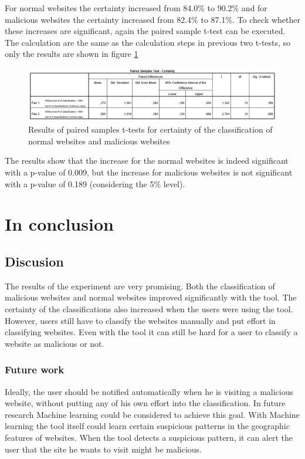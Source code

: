 \documentclass[twoside,openright,notitlepage]{uva-bachelor-thesis}
\begin{document}
For normal websites the certainty increased from 84.0\% to 90.2\% and for malicious websites the certainty increased from 82.4\% to 87.1\%. To check whether these increases are significant, again the paired sample t-test can be executed. The calculation are the same as the calculation steps in previous two t-tests, so only the results are shown in figure \ref{fig:zekerheid}

\begin{figure}[h!]
    \centering
    \includegraphics[width=1.2\textwidth, center]{img/zekerheid.PNG}
    \caption{Results of paired samples t-tests for certainty of the classification of normal websites and malicious websites}
    \label{fig:zekerheid}
\end{figure}

The results show that the increase for the normal websites is indeed significant with a p-value of 0.009, but the increase for malicious websites is not significant with a p-value of 0.189 (considering the 5\% level).

\FloatBarrier
\chapter{In conclusion}
\section{Discusion}
The results of the experiment are very promising. Both the classification of malicious websites and normal websites improved significantly with the tool. The certainty of the classifications also increased when the users were using the tool. However, users still have to classify the websites manually and put effort in classifying websites. Even with the tool it can still be hard for a user to classify a website as malicious or not.

\subsection{Future work}
Ideally, the user should be notified automatically when he is visiting a malicious website, without putting any of his own effort into the classification. In future research Machine learning could be considered to achieve this goal. With Machine learning the tool itself could learn certain suspicious patterns in the geographic features of websites. When the tool detects a suspicious pattern, it can alert the user that the site he wants to visit might be malicious.\\
\end{document}

